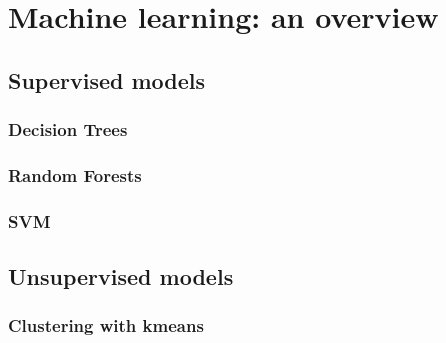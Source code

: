 \chapter{Machine learning: an overview}
\label{chp:ml}
\section{Supervised models}
\subsection{Decision Trees}
\subsection{Random Forests}
\subsection{SVM}
\section{Unsupervised models}
\subsection{Clustering with k\-means}
